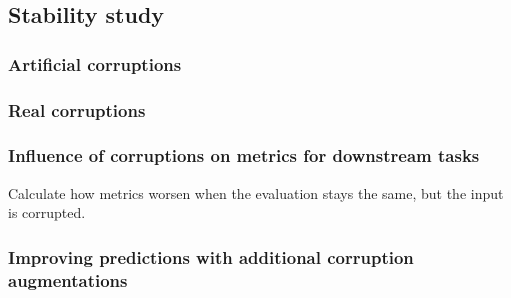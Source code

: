 \subsection{Stability study}
    \subsubsection{Artificial corruptions}
        
    \subsubsection{Real corruptions}
        
    \subsubsection{Influence of corruptions on metrics for downstream tasks}
        Calculate how metrics worsen when the evaluation stays the same, but the input is corrupted.
    \subsubsection{Improving predictions with additional corruption augmentations}
        